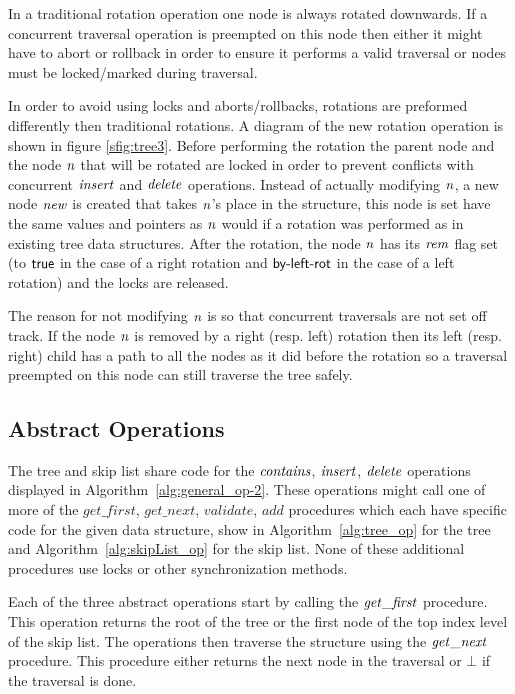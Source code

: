 In a traditional rotation operation one node is always rotated downwards.
If a concurrent traversal operation is preempted on this node then either it might have to abort
or rollback in order to ensure it performs a valid traversal or nodes must be locked/marked during traversal.

In order to avoid using locks and aborts/rollbacks, rotations are preformed differently then traditional rotations.
A diagram of the new rotation operation is shown in figure \ref{sfig:tree3}.
Before performing the rotation the parent node and the node $\ms{n}$ that will be rotated are locked in order to
prevent conflicts with concurrent $\ms{insert}$ and $\ms{delete}$ operations.
Instead of actually modifying $\ms{n}$, a new node $\ms{new}$ is created that takes $\ms{n}$'s place in the structure,
this node is set have the same values and pointers as $\ms{n}$ would if a rotation was performed as in
existing tree data structures.
After the rotation, the node $\ms{n}$ has its $\ms{rem}$ flag set (to $\lit{true}$ in the case of a right rotation
and $\lit{by-left-rot}$ in the case of a left rotation) and the locks are released.

The reason for not modifying $\ms{n}$ is so that concurrent traversals are not set off track.
If the node $\ms{n}$ is removed by a right (resp. left) rotation then its left (resp. right) child has a path to
all the nodes as it did before the rotation so a traversal preempted on this node can still traverse the tree safely.



\subsection{Abstract Operations}

The tree and skip list share code for the $\ms{contains}$, $\ms{insert}$, $\ms{delete}$ operations
displayed in Algorithm~\ref{alg:general_op-2}.
These operations might call one of more of the $get\_first$, $get\_next$, $validate$, $add$
procedures which each have specific code for the given data structure,
show in Algorithm~\ref{alg:tree_op} for the tree and Algorithm~\ref{alg:skipList_op}
for the skip list.
None of these additional procedures use locks or other synchronization methods.




Each of the three abstract operations start by calling the $\ms{get\_first}$ procedure.
This operation returns the root of the tree or the first node of the top index level of the skip list.
The operations then traverse the structure using the $\ms{get\_next}$ procedure.
This procedure either returns the next node in the traversal or $\bot$ if the traversal is done.

